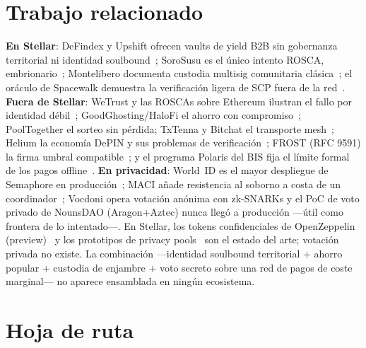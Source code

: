 \documentclass[twocolumn,10pt]{article}
\begin{document}
\section{Trabajo relacionado}
\label{sec:relacionado}

\textbf{En Stellar}: DeFindex y Upshift ofrecen vaults de yield B2B sin gobernanza territorial ni identidad soulbound~\cite{composability,upshift}; SoroSusu es el \'unico intento ROSCA, embrionario~\cite{sorosusu}; Montelibero documenta custodia multisig comunitaria cl\'asica~\cite{montelibero}; el or\'aculo de Spacewalk demuestra la verificaci\'on ligera de SCP fuera de la red~\cite{spacewalk}. \textbf{Fuera de Stellar}: WeTrust y las ROSCAs sobre Ethereum ilustran el fallo por identidad d\'ebil~\cite{wetrust}; GoodGhosting/HaloFi el ahorro con compromiso~\cite{goodghosting}; PoolTogether el sorteo sin p\'erdida; TxTenna y Bitchat el transporte mesh~\cite{txtenna,bitchat}; Helium la econom\'ia DePIN y sus problemas de verificaci\'on~\cite{helium}; FROST (RFC 9591) la firma umbral compatible~\cite{frost,frosted}; y el programa Polaris del BIS fija el l\'imite formal de los pagos offline~\cite{polaris}. \textbf{En privacidad}: World~ID es el mayor despliegue de Semaphore en producci\'on~\cite{worldid}; MACI a\~nade resistencia al soborno a costa de un coordinador~\cite{maci}; Vocdoni opera votaci\'on an\'onima con zk-SNARKs y el PoC de voto privado de NounsDAO (Aragon+Aztec) nunca lleg\'o a producci\'on ---\'util como frontera de lo intentado---. En Stellar, los tokens confidenciales de OpenZeppelin (preview)~\cite{conftok} y los prototipos de privacy pools~\cite{privpools} son el estado del arte; votaci\'on privada no existe. La combinaci\'on ---identidad soulbound territorial + ahorro popular + custodia de enjambre + voto secreto sobre una red de pagos de coste marginal--- no aparece ensamblada en ning\'un ecosistema.

\section{Hoja de ruta}
\label{sec:roadmap}
\end{document}

